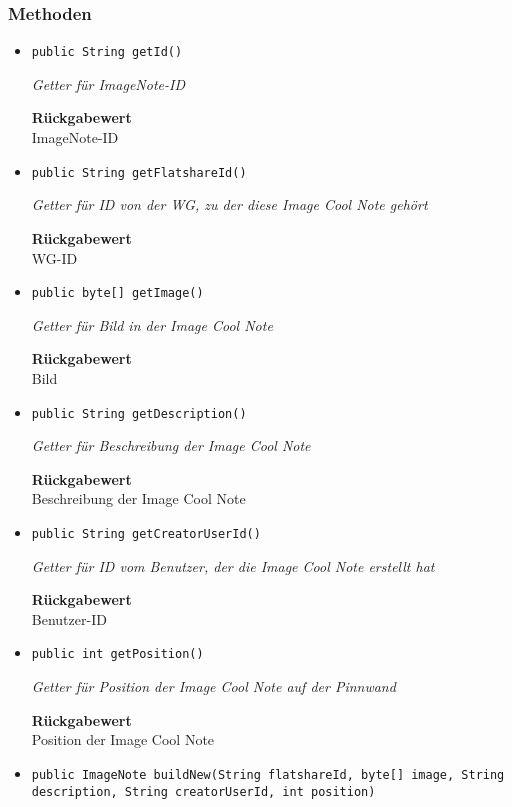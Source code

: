     \subsubsection*{Methoden}
    \begin{itemize}
    	\item{\texttt{public String getId()}}
    	
    	\textit{Getter für ImageNote-ID}
    	
    	
    	
    	\textbf{Rückgabewert} \\
    	ImageNote-ID        \item{\texttt{public String getFlatshareId()}}
    	
    	\textit{Getter für ID von der WG, zu der diese Image Cool Note gehört}
    	
    	
    	
    	\textbf{Rückgabewert} \\
    	WG-ID        \item{\texttt{public byte[] getImage()}}
    	
    	\textit{Getter für Bild in der Image Cool Note}
    	
    	
    	
    	\textbf{Rückgabewert} \\
    	Bild        \item{\texttt{public String getDescription()}}
    	
    	\textit{Getter für Beschreibung der Image Cool Note}
    	
    	
    	
    	\textbf{Rückgabewert} \\
    	Beschreibung der Image Cool Note        \item{\texttt{public String getCreatorUserId()}}
    	
    	\textit{Getter für ID vom Benutzer, der die Image Cool Note erstellt hat}
    	
    	
    	
    	\textbf{Rückgabewert} \\
    	Benutzer-ID        \item{\texttt{public int getPosition()}}
    	
    	\textit{Getter für Position der Image Cool Note auf der Pinnwand}
    	
    	
    	
    	\textbf{Rückgabewert} \\
    	Position der Image Cool Note        \item{\texttt{public ImageNote buildNew(String flatshareId, byte[] image, String description, String creatorUserId, int position)}}
    	

\end{itemize}
